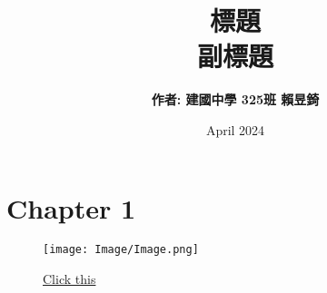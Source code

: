 \documentclass[12pt]{article}
\title{\textbf{標題}\\ \vspace{0.5cm}副標題}
\author{\textbf{作者: 建國中學 325班 賴昱錡}}
\date{April 2024}
\begin{document}
\graphicspath{{./Image}}
\doublespacing
\maketitle

\newpage
\tableofcontents
\newpage

\section{Chapter 1}
\begin{figure}[H]
    \centering
    \texttt{[image: Image/Image.png]}
    \begin{center}
        \href{https://www.youtube.com/watch?v=dQw4w9WgXcQ}{Click this}
    \end{center}
\end{figure}
\end{document}
